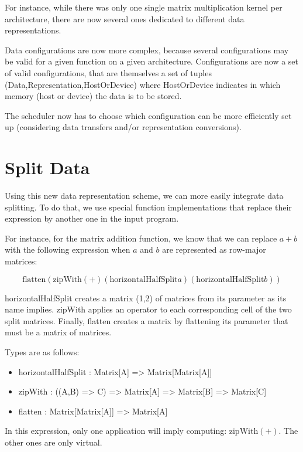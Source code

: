 For instance, while there was only one single matrix multiplication kernel per architecture,
there are now several ones dedicated to different data representations.

Data configurations are now more complex, because several configurations may be
valid for a given function on a given architecture. Configurations are now
a set of valid configurations, that are themselves a set of tuples
(Data,Representation,HostOrDevice) where HostOrDevice indicates in which memory
(host or device) the data is to be stored.

The scheduler now has to choose which configuration can be more efficiently set
up (considering data transfers and/or representation conversions).

\section{Split Data}
Using this new data representation scheme, we can more easily integrate data
splitting. To do that, we use special function implementations that replace
their expression by another one in the input program.

For instance, for the matrix addition function, we know that we can replace
$a+b$ with the following expression when $a$ and $b$ are represented as
row-major matrices:

\[
\text{flatten} (\text{zipWith} (+) (\text{horizontalHalfSplit} a) (\text{horizontalHalfSplit} b))
\]

horizontalHalfSplit creates a matrix (1,2) of matrices from its parameter as its
name implies.  zipWith applies an operator to each corresponding cell of the two split
matrices. Finally, flatten creates a matrix by flattening its parameter that
must be a matrix of matrices.

Types are as follows:
\begin{itemize}
  \item horizontalHalfSplit : Matrix[A] => Matrix[Matrix[A]]
  \item zipWith : ((A,B) => C) => Matrix[A] => Matrix[B] => Matrix[C]
  \item flatten : Matrix[Matrix[A]] => Matrix[A]
\end{itemize}

In this expression, only one application will imply computing: $\text{zipWith}
(+)$. The other ones are only virtual.
